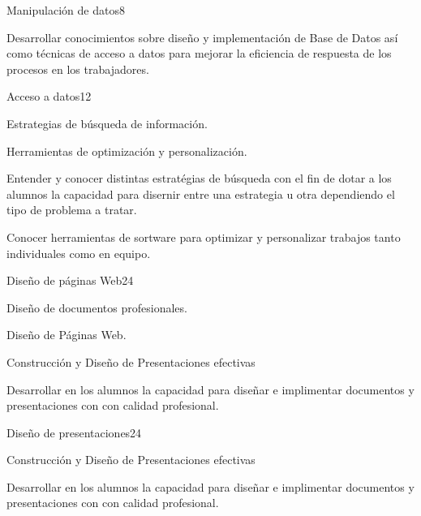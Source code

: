 \begin{syllabus}
\begin{unit}{Manipulación de datos}{}{8}
   \begin{unitgoals}
      \item  Desarrollar conocimientos sobre diseño y implementación de Base de Datos así como técnicas de acceso a datos para mejorar la eficiencia de respuesta de los procesos en los trabajadores.
   \end{unitgoals}
\end{unit}

\begin{unit}{Acceso a datos}{}{12}
   \begin{topics}
      \item Estrategias de búsqueda de información.
      \item Herramientas de optimización y personalización.
   \end{topics}

   \begin{unitgoals}
      \item Entender y conocer distintas estratégias de búsqueda con el fin de dotar a los alumnos la capacidad para disernir entre una estrategia  u otra dependiendo el tipo de problema a tratar.
      \item  Conocer herramientas de sortware para optimizar y personalizar trabajos tanto individuales como en equipo.
   \end{unitgoals}
\end{unit}

\begin{unit}{Diseño de páginas Web}{}{24}
   \begin{topics}
      \item Diseño de documentos profesionales.
      \item Diseño de Páginas Web.
      \item Construcción  y Diseño de Presentaciones  efectivas 
    \end{topics}
  \begin{unitgoals}
      \item Desarrollar en los alumnos la capacidad para diseñar  e implimentar documentos y presentaciones con 
       con calidad profesional.
  \end{unitgoals}
\end{unit}

\begin{unit}{Diseño de presentaciones}{}{24}
   \begin{topics}
      \item Construcción  y Diseño de Presentaciones  efectivas 
    \end{topics}
  \begin{unitgoals}
      \item Desarrollar en los alumnos la capacidad para diseñar  e implimentar documentos y presentaciones con 
       con calidad profesional.
  \end{unitgoals}
\end{unit}


\end{syllabus}

